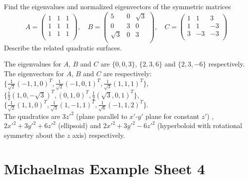 \documentclass[a4paper]{article}
\begin{document}
\begin{qns}
Find the eigenvalues and normalized eigenvectors of the symmetric matrices
$$A=\begin{pmatrix}1&1&1\\1&1&1\\1&1&1\\\end{pmatrix},\quad B=\begin{pmatrix}5&0&\sqrt{3}\\0&3&0\\\sqrt{3}&0&3\\\end{pmatrix},\quad C=\begin{pmatrix}1&1&3\\1&1&-3\\3&-3&-3\\\end{pmatrix}$$
Describe the related quadratic surfaces.
\end{qns}
\begin{ans}
The eigenvalues for $A$, $B$ and $C$ are $\{0,0,3\}$, $\{2,3,6\}$ and $\{2,3,-6\}$ respectively. The eigenvectors for $A$, $B$ and $C$ are respectively:  $\{\frac{1}{\sqrt{2}}(-1,1,0)^T,\frac{1}{\sqrt{2}}(-1,0,1)^T,\frac{1}{\sqrt{3}}(1,1,1)^T\}$, $\{\frac{1}{2}(1,0,-\sqrt{3})^T,(0,1,0)^T,\frac{1}{2}(\sqrt{3},0,1)^T\}$, $\{\frac{1}{\sqrt{2}}(1,1,0)^T,\frac{1}{\sqrt{3}}(1,-1,1)^T,\frac{1}{\sqrt{6}}(-1,1,2)^T\}$.\\[5pt]
The quadratics are $3z'^2$ (plane parallel to $x'$-$y'$ plane for constant $z'$) , $2x'^2+3y'^2+6z'^2$ (ellipsoid) and $2x'^2+3y'^2-6z'^2$ (hyperboloid with rotational symmetry about the $z$ axis) respectively.
\end{ans}
\newpage
\section{Michaelmas Example Sheet 4}
\end{document}
